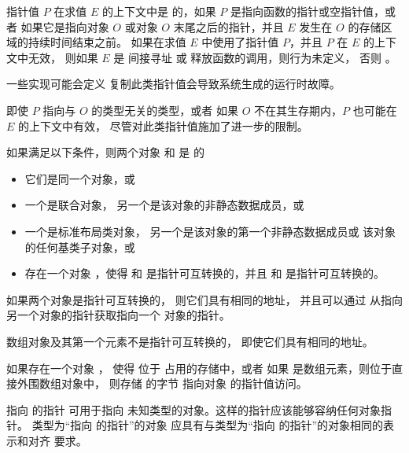 \pnum
指针值 $P$ 在求值 $E$ 的上下文中是
%
 的，如果 $P$ 是指向函数的指针或空指针值，或者
如果它是指向对象 $O$ 或对象 $O$ 末尾之后的指针，并且
$E$ 发生在 $O$ 的存储区域的持续时间结束之前。
如果在求值 $E$ 中使用了指针值 $P$，并且
$P$ 在 $E$ 的上下文中无效，
则如果 $E$ 是
间接寻址 或
释放函数的调用，则行为未定义，
否则 。
\begin{footnote}
一些实现可能会定义
复制此类指针值会导致系统生成的运行时故障。
\end{footnote}
\begin{note}
即使 $P$ 指向与 $O$ 的类型无关的类型，或者
如果 $O$ 不在其生存期内，$P$ 也可能在 $E$ 的上下文中有效，
尽管对此类指针值施加了进一步的限制。
\end{note}

\pnum
如果满足以下条件，则两个对象  和  是  的
\begin{itemize}
\item
它们是同一个对象，或
\item
一个是联合对象，
另一个是该对象的非静态数据成员，或
\item
一个是标准布局类对象，
另一个是该对象的第一个非静态数据成员或
该对象的任何基类子对象，或
\item
存在一个对象 ，使得
 和  是指针可互转换的，并且
 和  是指针可互转换的。
\end{itemize}
如果两个对象是指针可互转换的，
则它们具有相同的地址，
并且可以通过  从指向另一个对象的指针获取指向一个
对象的指针。
\begin{note}
数组对象及其第一个元素不是指针可互转换的，
即使它们具有相同的地址。
\end{note}

\pnum
如果存在一个对象 ，
使得  位于  占用的存储中，或者
如果  是数组元素，则位于直接外围数组对象中，
则存储  的字节
指向对象  的指针值访问。

\pnum
{}%
%
指向 \cv {} 的指针
可用于指向
未知类型的对象。这样的指针应该能够容纳任何对象指针。
类型为“指向 \cv {} 的指针”的对象
应具有与类型为“指向 \cv {} 的指针”的对象相同的表示和对齐
要求。

